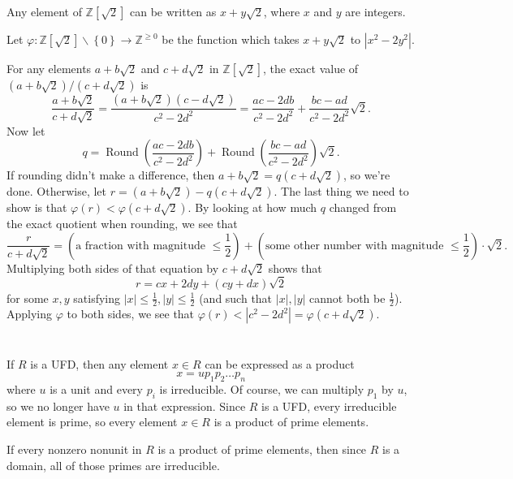 \documentclass[12pt]{article}
\begin{document}
\section{}
\noindent{}\bigskip\par
Any element of $\mathbb{Z}[\sqrt{2}]$ can be written as $x+y\sqrt{2}$, where $x$ and $y$ are integers.
\par
Let $\varphi: \mathbb{Z}[\sqrt{2}] \backslash \left\{ 0 \right\} \rightarrow \mathbb{Z}^{\geq 0}$ be the function which takes $x+y\sqrt{2}$ to $|x^2-2y^2|$.
\par
For any elements $a+b\sqrt{2}$ and $c+d\sqrt{2}$ in $\mathbb{Z}[\sqrt{2}]$, the exact value of $(a+b\sqrt{2})/(c+d\sqrt{2})$ is
\[ \frac{a+b\sqrt{2}}{c+d\sqrt{2}} = \frac{(a+b\sqrt{2})(c-d\sqrt{2})}{c^2-2d^2} = \frac{ac-2db}{c^2-2d^2} + \frac{bc-ad}{c^2-2d^2} \sqrt{2}. \]
Now let
\[ q = \operatorname{Round} \left( \frac{ac-2db}{c^2-2d^2} \right) + \operatorname{Round} \left( \frac{bc-ad}{c^2-2d^2} \right) \sqrt{2}. \]
If rounding didn't make a difference, then $a+b\sqrt{2}=q(c+d\sqrt{2})$, so we're done. Otherwise, let $r = (a+b\sqrt{2}) - q(c+d\sqrt{2})$. The last thing we need to show is that $\varphi(r) < \varphi(c+d\sqrt{2})$. By looking at how much $q$ changed from the exact quotient when rounding, we see that
\[ \frac{r}{c+d\sqrt{2}} = \left( \text{a fraction with magnitude $\leq \frac{1}{2}$} \right) + \left( \text{some other number with magnitude $\leq \frac{1}{2}$} \right) \cdot \sqrt{2}. \]
Multiplying both sides of that equation by $c+d\sqrt{2}$ shows that
\[ r = cx+2dy+(cy+dx) \sqrt{2} \]
for some $x,y$ satisfying $|x|\leq \frac{1}{2}, |y| \leq \frac{1}{2}$ (and such that $|x|, |y|$ cannot both be $\frac{1}{2}$). Applying $\varphi$ to both sides, we see that $\varphi(r) < |c^2-2d^2| = \varphi(c+d\sqrt{2})$.

\section{}
\noindent{}\bigskip\par
If $R$ is a UFD, then any element $x \in R$ can be expressed as a product
\[ x = u p_1 p_2 \dots p_n \]
    where $u$ is a unit and every $p_i$ is irreducible. Of course, we can multiply $p_1$ by $u$, so we no longer have $u$ in that expression. Since $R$ is a UFD, every irreducible element is prime, so every element $x \in R$ is a product of prime elements.
\par
If every nonzero nonunit in $R$ is a product of prime elements, then since $R$ is a domain, all of those primes are irreducible.
\end{document}
